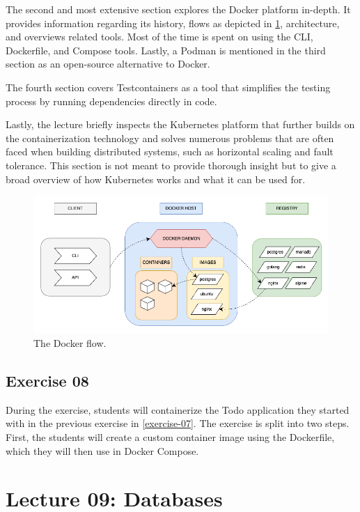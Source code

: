 \documentclass[
  digital,
  color,
  oneside,
  nosansbold,
  nocolorbold,
  nolof,
  nolot,
]{fithesis4}
\begin{document}
The second and most extensive section explores the Docker\cite{docker} platform in-depth. It provides information regarding its history, flows as depicted in \cref{fig:docker}, architecture, and overviews related tools. Most of the time is spent on using the CLI, Dockerfile, and Compose tools. Lastly, a Podman\cite{podman} is mentioned in the third section as an open-source alternative to Docker.

The fourth section covers Testcontainers\cite{testcontainers} as a tool that simplifies the testing process by running dependencies directly in code.

Lastly, the lecture briefly inspects the Kubernetes\cite{kubernetes} platform that further builds on the containerization technology and solves numerous problems that are often faced when building distributed systems, such as horizontal scaling and fault tolerance. This section is not meant to provide thorough insight but to give a broad overview of how Kubernetes works and what it can be used for.

\begin{figure}[H]
    \centering
    \includegraphics[width=12cm]{figures/docker.png}
    \caption{The Docker flow.}
    \label{fig:docker}
\end{figure}

\subsection{Exercise 08}\label{exercise-08}

During the exercise, students will containerize the Todo application they started with in the previous exercise in \cref{exercise-07}. The exercise is split into two steps. First, the students will create a custom container image using the Dockerfile, which they will then use in Docker Compose.

\section{Lecture 09: Databases}\label{lecture-databases}
\end{document}

